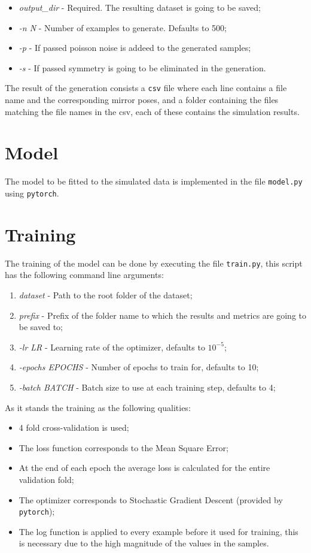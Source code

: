 \documentclass[conference]{IEEEtran}
\begin{document}
\begin{itemize}
    \item \textit{output\_dir} - Required. The resulting dataset is going to be
    saved;
    \item \textit{-n N} - Number of examples to generate. Defaults to 500;
    \item \textit{-p} - If passed poisson noise is addeed to the generated samples;
    \item \textit{-s} - If passed symmetry is going to be eliminated
    in the generation.
\end{itemize}

The result of the generation consists a \verb|csv| file where each line
contains a file name and the corresponding mirror poses, and a folder containing
the files matching the file names in the csv, each of these contains the simulation
results.

\section{Model}

The model to be fitted to the simulated data is implemented in the file \verb|model.py|
using \verb|pytorch|.

\section{Training}

The training of the model can be done by executing the file \verb|train.py|, this script
has the following command line arguments:

\begin{enumerate}
    \item \textit{dataset} - Path to the root folder of the dataset;
    \item \textit{prefix} - Prefix of the folder name to which the results and 
    metrics are going to be saved to;
    \item \textit{-lr LR} - Learning rate of the optimizer, defaults to $10^{-5}$;
    \item \textit{-epochs EPOCHS} - Number of epochs to train for, defaults to 10;
    \item \textit{-batch BATCH} - Batch size to use at each training step, defaults to 4;
\end{enumerate}

As it stands the training as the following qualities:
\begin{itemize}
    \item 4 fold cross-validation is used;
    \item The loss function corresponds to the Mean Square Error;
    \item At the end of each epoch the average loss is calculated 
    for the entire validation fold;
    \item The optimizer corresponds to Stochastic Gradient Descent 
    (provided by \verb|pytorch|);
    \item The log function is applied to every example before it 
    used for training, this is necessary due to the high magnitude
    of the values in the samples.
\end{itemize}
\end{document}
